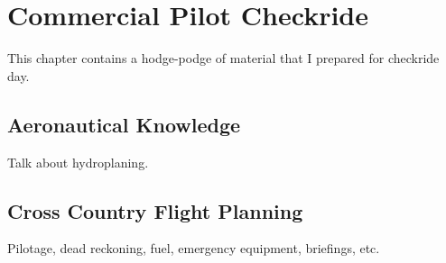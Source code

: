 \chapter{Commercial Pilot Checkride}

This chapter contains a hodge-podge of material that I prepared for checkride day.

\section{Aeronautical Knowledge}

Talk about hydroplaning.

\section{Cross Country Flight Planning}

Pilotage, dead reckoning, fuel, emergency equipment, briefings, etc.


